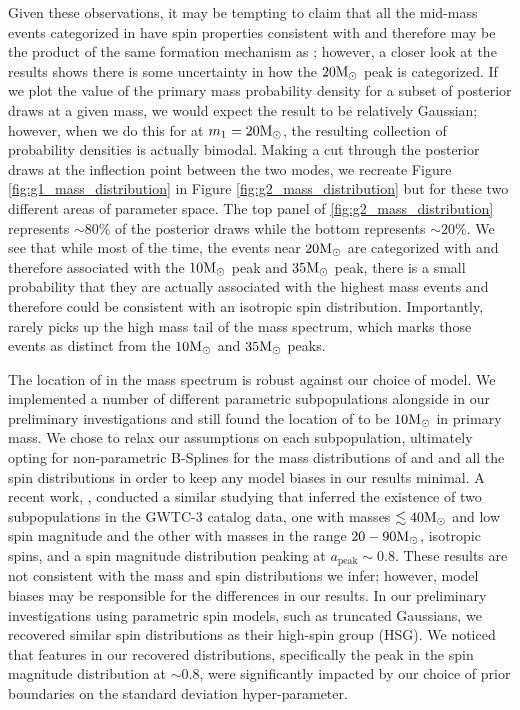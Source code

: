 Given these observations, it may be tempting to claim that all the mid-mass events categorized in \contA{} have spin properties consistent with \first{} and therefore may be the product of the same formation mechanism as \first{}; however, a closer look at the results shows there is some uncertainty in how the $20 {\rm M}_\odot$ peak is categorized. If we plot the value of the primary mass probability density for a subset of posterior draws at a given mass, we would expect the result to be relatively Gaussian; however, when we do this for \contB{} at $m_1 = 20 {\rm M}_\odot$, the resulting collection of probability densities is actually bimodal. Making a cut through the posterior draws at the inflection point between the two modes, we recreate Figure \ref{fig:g1_mass_distribution} in Figure \ref{fig:g2_mass_distribution} but for these two different areas of parameter space. The top panel of \ref{fig:g2_mass_distribution} represents $\sim80\%$ of the posterior draws while the bottom represents $\sim20\%$. We see that while most of the time, the events near $20{\rm M}_\odot$ are categorized with \contA{} and therefore associated with the $10{\rm M}_\odot$ peak and $35{\rm M}_\odot$ peak, there is a small probability that they are actually associated with the highest mass events and therefore could be consistent with an isotropic spin distribution. Importantly, \contA{} rarely picks up the high mass tail of the mass spectrum, which marks those events as distinct from the $10{\rm M}_\odot$ and $35{\rm M}_\odot$ peaks. 

The location of \first{} in the mass spectrum is robust against our choice of model. We implemented a number of different parametric subpopulations alongside \first{} in our preliminary investigations and still found the location of \first{} to be $10{\rm M}_\odot$ in primary mass. We chose to relax our assumptions on each subpopulation, ultimately opting for non-parametric B-Splines for the mass distributions of \contA{} and \contB{} and all the spin distributions in order to keep any model biases in our results minimal. A recent work, \citet{2303.02973}, conducted a similar studying that inferred the existence of two subpopulations in the GWTC-3 catalog data, one with masses $\lesssim 40{\rm M}_\odot$ and low spin magnitude and the other with masses in the range $20-90{\rm M}_\odot$, isotropic spins, and a spin magnitude distribution peaking at $a_\text{peak} \sim 0.8$. These results are not consistent with the mass and spin distributions we infer; however, model biases may be responsible for the differences in our results. In our preliminary investigations using parametric spin models, such as truncated Gaussians, we recovered similar spin distributions as their high-spin group (HSG). We noticed that features in our recovered distributions, specifically the peak in the spin magnitude distribution at $\sim 0.8$, were significantly impacted by our choice of prior boundaries on the standard deviation hyper-parameter.

